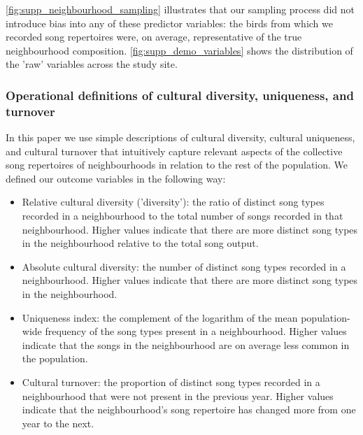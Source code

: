 \documentclass[9pt, onecolumn, twoside, lineno]{gsajnl}
\begin{document}
\noindent\autoref{fig:supp_neighbourhood_sampling} illustrates that our sampling process did not introduce bias into any of these predictor variables: the birds from which we recorded song repertoires were, on average, representative of the true neighbourhood composition. \autoref{fig:supp_demo_variables} shows the distribution of the 'raw' variables across the study site.

\subsubsection{Operational definitions of cultural diversity, uniqueness, and turnover}
\label{sc:op-definitions}

In this paper we use simple descriptions of cultural diversity, cultural uniqueness, and cultural turnover that intuitively capture relevant aspects of the collective song repertoires of neighbourhoods in relation to the rest of the population. We defined our outcome variables in the following way:

\begin{itemize}
    \item Relative cultural diversity ('diversity'): the ratio of distinct song types recorded in a neighbourhood to the total number of songs recorded in that neighbourhood. Higher values indicate that there are more distinct song types in the neighbourhood relative to the total song output.
    \item Absolute cultural diversity: the number of distinct song types recorded in a neighbourhood. Higher values indicate that there are more distinct song types in the neighbourhood.
    \item Uniqueness index: the complement of the logarithm of the mean population-wide frequency of the song types present in a neighbourhood. Higher values indicate that the songs in the neighbourhood are on average less common in the population.
    \item Cultural turnover: the proportion of distinct song types recorded in a neighbourhood that were not present in the previous year. Higher values indicate that the neighbourhood's song repertoire has changed more from one year to the next.
\end{itemize}
\end{document}
